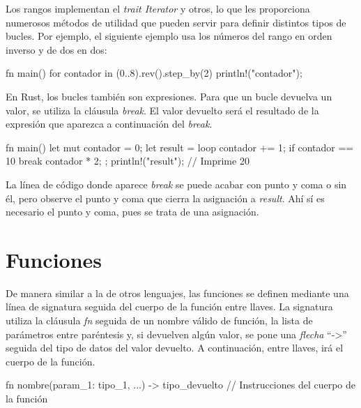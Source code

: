 Los rangos implementan el \textit{trait Iterator} y otros, lo que les proporciona numerosos métodos de utilidad que pueden servir para definir distintos tipos de bucles. Por ejemplo, el siguiente ejemplo usa los números del rango en orden inverso y de dos en dos:

\vspace{0.7em}
\begin{Codigo}
fn main() {
   for contador in (0..8).rev().step_by(2) {
      println!("{contador}");
   }
}
\end{Codigo}

\vspace{1em}

En Rust, los bucles también son expresiones. Para que un bucle devuelva un valor, se utiliza la cláusula \textit{break}. El valor devuelto será el resultado de la expresión que aparezca a continuación del \textit{break}. 

\vspace{0.7em}
\begin{Codigo}
   fn main() {
      let mut contador = 0;
      let result = loop {
         contador += 1;
         if contador == 10 {
            break contador * 2;
         }
      };
      println!("{result}"); // Imprime 20
   }
\end{Codigo}

La línea de código donde aparece \textit{break} se puede acabar con punto y coma o sin él, pero observe el punto y coma que cierra la asignación a \textit{result}. Ahí sí es necesario el punto y coma, pues se trata de una asignación.


\section{Funciones}
\label{sec_funciones}
\noindent De manera similar a la de otros lenguajes, las funciones se definen mediante una línea de signatura seguida del cuerpo de la función entre llaves. La signatura utiliza la cláusula \textit{fn} seguida de un nombre válido de función, la lista de parámetros entre paréntesis y, si devuelven algún valor, se pone una \textit{flecha} ``->'' seguida del tipo de datos del valor devuelto. A continuación, entre llaves, irá el cuerpo de la función.

\vspace{0.7em}
\begin{Codigo}
fn nombre(param_1: tipo_1, ...) -> tipo_devuelto {
   // Instrucciones del cuerpo de la función
}
\end{Codigo}

